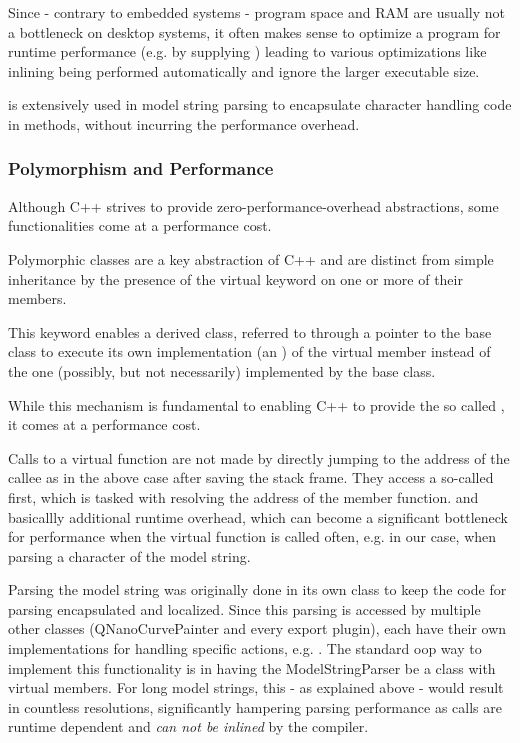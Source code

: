 Since - contrary to embedded systems - program space and RAM are usually not a bottleneck on desktop systems, it often makes sense to optimize a program for runtime performance (e.g. by supplying  ) leading to various optimizations like inlining being performed automatically and ignore the larger executable size.

 is extensively used in model string parsing to encapsulate character handling code in methods, without incurring the performance overhead.

\subsubsection{Polymorphism and Performance}
Although C++ strives to provide zero-performance-overhead abstractions, some functionalities come at a performance cost.

Polymorphic classes are a key abstraction of C++ and are distinct from simple inheritance by the presence of the virtual keyword on one or more of their members.

This keyword enables a derived class, referred to through a pointer to the base class to execute its own implementation (an ) of the virtual member instead of the one (possibly, but not necessarily) implemented by the base class.

While this mechanism is fundamental to enabling C++ to provide the so called , it comes at a performance cost.

Calls to a virtual function are not made by directly jumping to the address of the callee as in the above case after saving the stack frame. They access a so-called  first, which is tasked with resolving the address of the member function.
 and basicallly additional runtime overhead, which can become a significant bottleneck for performance when the virtual function is called often, e.g. in our case, when parsing a character of the model string.

Parsing the model string was originally done in its own class to keep the code for parsing encapsulated and localized. Since this parsing is accessed by multiple other classes (QNanoCurvePainter and every export plugin), each have their own implementations for handling specific actions, e.g. . The standard \gls{oop} way to implement this functionality is in having the ModelStringParser be a class with virtual members. For long model strings, this - as explained above - would result in countless  resolutions, significantly hampering parsing performance as  calls are runtime dependent and \emph{can not be inlined} by the compiler.

